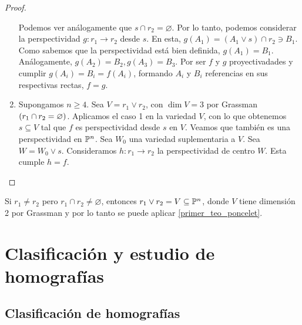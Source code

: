 \begin{proof}
\begin{enumerate}
         Podemos ver análogamente que $s \cap r_2 = \varnothing$. Por 
         lo tanto, podemos considerar la perspectividad $g: r_1 \to
         r_2$ desde $s$. En esta, $g(A_1) = (A_1 \vee s) \cap r_2 \ni
         B_1$. Como sabemos que la perspectividad está bien definida,
         $g(A_1) = B_1$. Análogamente, $g(A_2) = B_2, g(A_3) = B_3$.
         Por ser $f$ y $g$ proyectivadades y cumplir $g(A_i) = B_i =
         f(A_i)$, formando $A_i$ y $B_i$ referencias en sus 
         respectivas rectas, $f = g$.
        \item Supongamos $n \geq 4$. Sea $V = r_1 \vee r_2$, con
        $\dim V = 3$ por Grassman $\left( r_1 \cap r_2 = \varnothing\right)$.
        Aplicamos el caso 1 en la variedad $V$, con lo que obtenemos
        $s \subseteq V$ tal que $f$ es perspectividad desde $s$ en
        $V$. Veamos que también es una perspectividad en $\mathbb{P}^n$.
        Sea $W_0$ una variedad suplementaria a $V$. Sea $W = W_0 \vee
        s$. Consideramos $h: r_1 \to r_2$ la perspectividad de centro
        $W$. Esta cumple $h = f$.
    \end{enumerate}
\end{proof}

\begin{obs}
    Si $r_1 \neq r_2$ pero $r_1 \cap r_2 \neq \varnothing$, entonces
    $r_1 \vee r_2 = V \subseteq \mathbb{P}^n$, donde $V$ tiene dimensión
    2 por Grassman y por lo tanto se puede 
    aplicar \ref{primer_teo_poncelet}.
\end{obs}

\section{Clasificación y estudio de homografías}

\subsection{Clasificación de homografías}

